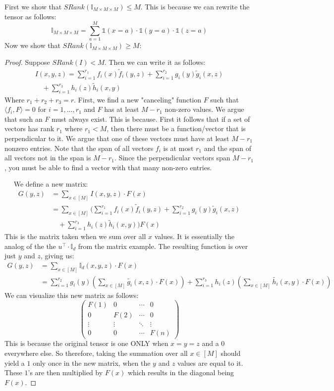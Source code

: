 \documentclass[11pt]{article}
\theoremstyle{definition}
\begin{document}
First we show that $SRank(\mathds{I}_{M\times M \times M}) \leq M$. This is because we can rewrite the tensor as follows:
$$\mathds{I}_{M \times M \times M} = \sum_{a=1}^M \mathds{1}(x=a) \cdot \mathds{1}(y=a) \cdot \mathds{1}(z=a)$$
Now we show that $SRank(\mathds{I}_{M\times M \times M}) \geq M$:
\begin{proof}
Suppose $SRank(I) < M$. Then we can write it as follows:
\begin{align*}
I(x,y,z) = \sum_{i=1}^{r_1} f_i(x)\widetilde f_i(y,z) + \sum_{i=1}^{r_2} g_i(y)\widetilde g_i(x,z) \\
    \quad + \sum_{i=1}^{r_3} h_i(z)\widetilde h_i(x,y)
\end{align*}
Where $r_1 + r_2 + r_3 = r$. First, we find a new "canceling" function $F$ such that $\langle f_i, F \rangle = 0$ for $i=1,...,r_1$ and $F$ has at least $M-r_1$ non-zero values. We argue that such an $F$ must always exist. This is because. First it follows that if a set of vectors has rank $r_1$ where $r_1 < M$, then there must be a function/vector that is perpendicular to it. We argue that one of these vectors must have at least $M-r_1$ nonzero entries. Note that the span of all vectors $f_i$ is at most $r_1$ and the span of all vectors not in the span is $M-r_1$. Since the perpendicular vectors span $M-r_1$, you must be able to find a vector with that many non-zero entries.

$\quad$ We define a new matrix:
\begin{align*}
    G(y,z) &= \sum_{x\in [M]} I(x,y,z) \cdot F(x)\\
    &= \sum_{x\in [M]}(\sum_{i=1}^{r_1} f_i(x)\widetilde f_i(y,z) + \sum_{i=1}^{r_2} g_i(y)\widetilde g_i(x,z) \\
    &\quad + \sum_{i=1}^{r_3} h_i(z)\widetilde h_i(x,y))F(x)
\end{align*}
This is the matrix taken when we sum over all $x$ values. It is essentially the analog of the the $u^\top \cdot \mathds{I}_d$ from the matrix example. The resulting function is over just $y$ and $z$, giving us:
\begin{align*}
    G(y,z) &= \sum_{x\in [M]}\mathds{I}_d (x,y,z) \cdot F(x)\\
        &= \sum_{i=1}^{r_2}g_i(y) (\sum_{x\in [M]}\widetilde{g_i}(x,z)\cdot F(x)) + \sum_{i=1}^{r_3}h_i(z)(\sum_{x\in [M]}\widetilde{h_i}(x,y)\cdot F(x))
\end{align*}
We can visualize this new matrix as follows:
$$\begin{pmatrix}
F(1) & 0 & \cdots & 0 \\
0 & F(2) & \cdots & 0 \\
\vdots & \vdots & \ddots & \vdots \\
0 & 0 & \cdots & F(n)
\end{pmatrix}$$
This is because the original tensor is one ONLY when $x = y = z$ and a $0$ everywhere else. So therefore, taking the summation over all $x \in [M]$ should yield a $1$ only once in the new matrix, when the $y$ and $z$ values are equal to it. These $1$'s are then multiplied by $F(x)$ which results in the diagonal being $F(x)$.


\end{proof}
\end{document}
